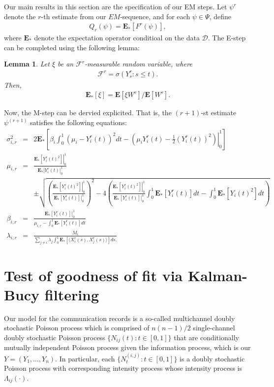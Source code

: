 \documentclass[12pt]{article}%
\newtheorem{lem}{Lemma}
\begin{document}
Our main results in this section are the specification of our EM steps.  Let $\psi^r$ denote the $r$-th estimate from our $EM$-sequence, and for each $\psi \in \Psi$, define  
\begin{eqnarray}
Q_r(\psi) = \mathbf E_*[F^r(\psi)],
\end{eqnarray}
where $\mathbf E_*$ denote the expectation operator conditioal on the data $\mathcal D$.  
The E-step can be completed using the following lemma:
\begin{lem}
Let $\xi$ be an $\mathcal F^r$-measurable random variable, where
\begin{eqnarray}
\mathcal F^r = \sigma(Y_s^r: s \le t).
\end{eqnarray}  
Then, 
\begin{eqnarray}
\mathbf E_*[\xi] = \mathbf E[\xi W^r]/\mathbf E[W^r].
\end{eqnarray}
\end{lem}
Now, the M-step can be dervied explicited.  That is, the $(r+1)$-st estimate $\psi^{(r+1)}$ satisfies the following equations:
\begin{eqnarray*}
\sigma_{i,r}^2 &=& 2 \mathbf E_*\left[ \beta_i \int_0^1 \left(\mu_i - Y_i^r(t)\right)^2dt 
- \left(\left.\mu_i Y_i^r(t) - \frac{1}{2} (Y_i^r(t))^2\right)\right|_0^1\right]\\\mu_{i,r} 
&=&  \frac{\left. \mathbf E_*[Y_i^r(t)^2]\right|_0^1}{\left.\mathbf E_*[Y_i^r(t)\right|_0^1}\\ 
&\ &\pm
\sqrt{
\left(\frac{\left.\mathbf E_*[Y_i^r(t)^2]\right|_0^1}{\left.\mathbf E_*[Y_i^r(t)]\right|_0^1}\right)^2 
-
4\left( \frac{\left.\mathbf E_*[Y_i^r(t)^2]\right|_0^1}{\left.\mathbf E_*[Y_i^r(t)]\right|_0^1} \int_0^1\mathbf E_*[Y_i^r(t)]dt - \int_0^1 \mathbf E_*[Y_i(t)^2] dt\right)}\\
\beta_{i,r}
&=&
\frac{\left. \mathbf E_*[Y_i^r(t)] \right|_0^1}{\mu_{i,r} - \int_0^1 \mathbf E_*[Y_i^r(t)]dt}\\
\lambda_{i,r} 
&=& 
\frac{M_i}
{
\sum_{j\neq i} \lambda_j \int_0^1 \mathbf E_*[\langle X_i^r(s), X_j^r(s)\rangle] ds.
} 
\end{eqnarray*}


\section{Test of goodness of fit via Kalman-Bucy filtering}
Our model for the communication records is a so-called multichannel doubly stochastic Poisson process 
which is comprised of $n(n-1)/2$ single-channel doubly stochastic Poisson process $\{N_{ij}(t):t\in[0,1]\}$ 
that are conditionally mutually independent Poisson process given the information process, 
which is our $Y=(Y_1,\ldots,Y_n)$.  In particular, each $\{N_t^{(i,j)} : t \in [0,1]\}$ is a doubly stochastic 
Poisson process with corresponding intensity process whose intensity process is $\Lambda_{ij}(\cdot)$.  
\end{document}
